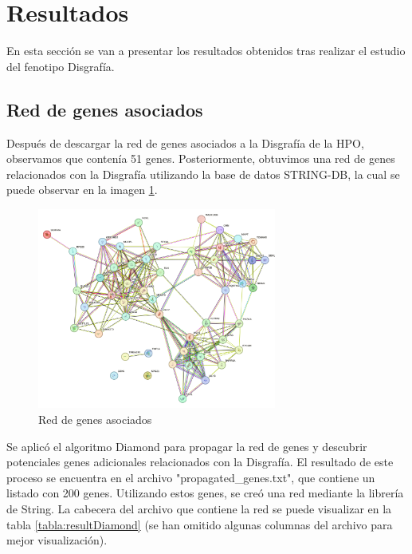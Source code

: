 
\section{Resultados}

En esta sección se van a presentar los resultados obtenidos tras realizar el estudio del fenotipo Disgrafía.

\subsection{Red de genes asociados}

Después de descargar la red de genes asociados a la Disgrafía de la HPO, observamos que contenía 51 genes. Posteriormente, obtuvimos una red de genes relacionados con la Disgrafía utilizando la base de datos STRING-DB, la cual se puede observar en la imagen \ref{fig:genesAsociados}.

\begin{figure}[h!]
	\centering
	\includegraphics[width=0.7\textwidth]{figures/stringdb_51_genes.png}
	\caption{Red de genes asociados}
	\label{fig:genesAsociados}
\end{figure}

Se aplicó el algoritmo Diamond para propagar la red de genes y descubrir potenciales genes adicionales relacionados con la Disgrafía. El resultado de este proceso se encuentra en el archivo "propagated\_genes.txt", que contiene un listado con 200 genes. Utilizando estos genes, se creó una red mediante la librería de String. La cabecera del archivo que contiene la red se puede visualizar en la tabla \ref{tabla:resultDiamond} (se han omitido algunas columnas del archivo para mejor visualización).

